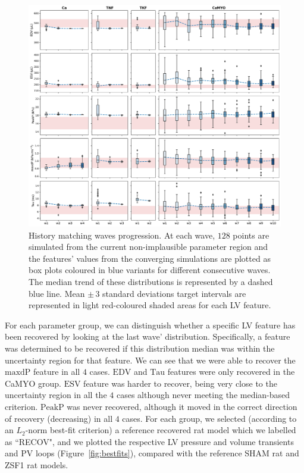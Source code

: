 \begin{figure}[!ht]
    \myfloatalign
    \includegraphics[width=\textwidth]{figures/chapter07/Fig_6.pdf}
    \caption{History matching waves progression. At each wave, $128$ points are simulated from the current non-implausible parameter region and the features' values from the converging simulations are plotted as box plots coloured in blue variants for different consecutive waves. The median trend of these distributions is represented by a dashed blue line. Mean $\pm\,3$ standard deviations target intervals are represented in light red-coloured shaded areas for each LV feature.}
    \label{fig:lvfeatsmatch}
\end{figure}

\vspace{0.2cm}
For each parameter group, we can distinguish whether a specific LV feature has been recovered by looking at the last wave' distribution. Specifically, a feature was determined to be recovered if this distribution median was within the uncertainty region for that feature. We can see that we were able to recover the $\textrm{maxdP}$ feature in all $4$ cases. $\textrm{EDV}$ and $\textrm{Tau}$ features were only recovered in the CaMYO group. $\textrm{ESV}$ feature was harder to recover, being very close to the uncertainty region in all the $4$ cases although never meeting the median-based criterion. $\textrm{PeakP}$ was never recovered, although it moved in the correct direction of recovery (decreasing) in all $4$ cases. For each group, we selected (according to an $L_2$-norm best-fit criterion) a reference recovered rat model which we labelled as ``RECOV", and we plotted the respective LV pressure and volume transients and PV loops (Figure~\ref{fig:bestfits}), compared with the reference SHAM rat and ZSF1 rat models.

